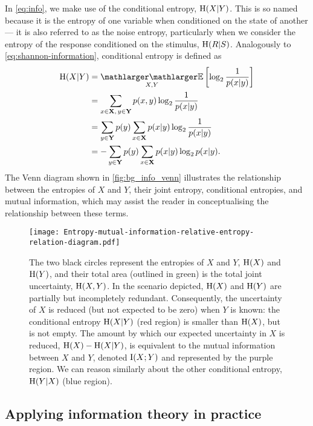 In \autoref{eq:info}, we make use of the conditional entropy, $\operatorname{H}(X | Y)$.
This is so named because it is the entropy of one variable when conditioned on the state of another --- it is also referred to as the noise entropy, particularly when we consider the entropy of the response conditioned on the stimulus, $\operatorname{H}(R|S)$.
Analogously to \autoref{eq:shannon-information}, conditional entropy is defined as
\begin{align}
\HH(X | Y)
  &= \EE_{X, Y} \left[ \log_2 \frac{1}{p(x|y)} \right] \notag
\\&= \sum_{x \in \SET{X}, \, y \in \SET{Y}} p(x,y) \log_2 \frac{1}{p(x|y)} \notag
\\&= \sum_{y \in \SET{Y}} p(y) \sum_{x \in \SET{X}} p(x|y) \log_2 \frac{1}{p(x|y)} \notag
\\&= - \sum_{y \in \SET{Y}} p(y) \sum_{x \in \SET{X}} p(x|y) \log_2 p(x|y)
.\end{align}
The Venn diagram shown in \autoref{fig:bg_info_venn} illustrates the relationship between the entropies of $X$ and $Y$, their joint entropy, conditional entropies, and mutual information, which may assist the reader in conceptualising the relationship between these terms.

\begin{figure}[htbp]
\centering
\texttt{[image: Entropy-mutual-information-relative-entropy-relation-diagram.pdf]}
\caption{
The two black circles represent the entropies of $X$ and $Y$, $\operatorname{H}(X)$ and $\operatorname{H}(Y)$, and their total area (outlined in green) is the total joint uncertainty, $\operatorname{H}(X, Y)$.
In the scenario depicted, $\operatorname{H}(X)$ and $\operatorname{H}(Y)$ are partially but incompletely redundant.
Consequently, the uncertainty of $X$ is reduced (but not expected to be zero) when $Y$ is known: the conditional entropy $\operatorname{H}(X|Y)$ (red region) is smaller than $\operatorname{H}(X)$, but is not empty.
The amount by which our expected uncertainty in $X$ is reduced, $\operatorname{H}(X) - \operatorname{H}(X|Y)$, is equivalent to the mutual information between $X$ and $Y$, denoted $\operatorname{I}(X;Y)$ and represented by the purple region.
We can reason similarly about the other conditional entropy, $\operatorname{H}(Y|X)$ (blue region).
}
\label{fig:bg_info_venn}
\end{figure}


\subsection{Applying information theory in practice}

